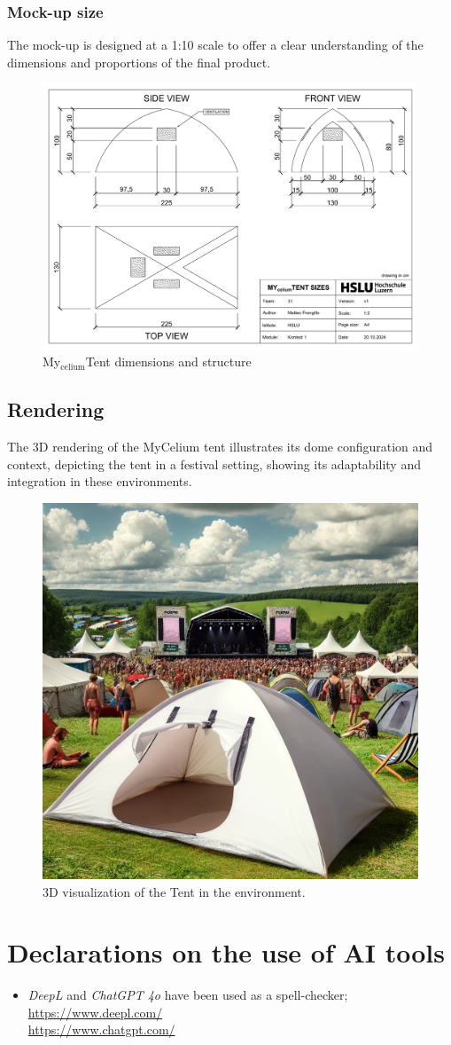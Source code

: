 \documentclass{article}
\begin{document}
\subsubsection{Mock-up size}
The mock-up is designed at a 1:10 scale to offer a clear understanding of the dimensions
and proportions of the final product.
\vspace*{-.2cm}
\begin{figure}[ht!]
    \centering
    \includegraphics[width=\textwidth]{media/mytent-size.png}
    \caption{My$_{\text{celium}}$Tent dimensions and structure}
\end{figure}

\subsection{Rendering}
The 3D rendering of the MyCelium tent illustrates its dome configuration and context,
depicting the tent in a festival setting, showing its adaptability and integration in
these environments.

\begin{figure}[ht!]
    \centering
    \includegraphics[width=.55\textwidth]{media/3d-tent-rendering.png}
    \caption{3D visualization of the Tent in the environment.}
\end{figure}

\section{Declarations on the use of AI tools}
\begin{itemize}
    \item \textit{DeepL} and \textit{ChatGPT 4o} have been used as a spell-checker;\\
        \url{https://www.deepl.com/}\\
        \url{https://www.chatgpt.com/}
\end{itemize}

\newpage
\listoftables

\listoffigures
\end{document}

